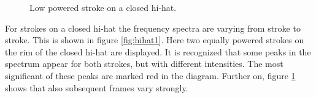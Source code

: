 \begin{figure}[hbp]
	\centering
	\caption{Low powered stroke on a closed hi-hat.}
	\label{fig:hihat2}
\end{figure}

For strokes on a closed hi-hat the frequency spectra are varying from stroke to stroke. This is shown in figure \ref{fig:hihat1}. Here two equally powered strokes on the rim of the closed hi-hat are displayed. It is recognized that some peaks in the spectrum appear for both strokes, but with different intensities. The most significant of these peaks are marked red in the diagram. Further on, figure \ref{fig:hihat2} shows that also subsequent frames vary strongly.

